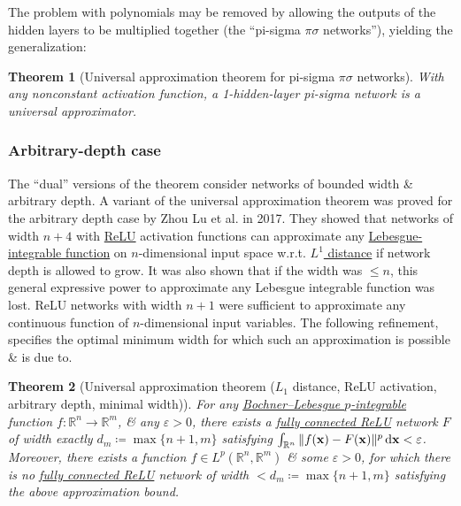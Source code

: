 \documentclass{article}
\newtheorem{theorem}{Theorem}
\begin{document}
The problem with polynomials may be removed by allowing the outputs of the hidden layers to be multiplied together (the ``pi-sigma $\pi\sigma$ networks''), yielding the generalization:

\begin{theorem}[Universal approximation theorem for pi-sigma $\pi\sigma$ networks]
	With any nonconstant activation function, a 1-hidden-layer pi-sigma network is a universal approximator.
\end{theorem}

\subsubsection{Arbitrary-depth case}
The ``dual'' versions of the theorem consider networks of bounded width \& arbitrary depth. A variant of the universal approximation theorem was proved for the arbitrary depth case by Zhou Lu et al. in 2017. They showed that networks of width $n + 4$ with \href{https://en.wikipedia.org/wiki/ReLU}{ReLU} activation functions can approximate any \href{https://en.wikipedia.org/wiki/Lebesgue_integration}{Lebesgue-integrable function} on $n$-dimensional input space w.r.t. \href{https://en.wikipedia.org/wiki/L1_distance}{$L^1$ distance} if network depth is allowed to grow. It was also shown that if the width was $\le n$, this general expressive power to approximate any Lebesgue integrable function was lost. ReLU networks with width $n + 1$ were sufficient to approximate any continuous function of $n$-dimensional input variables. The following refinement, specifies the optimal minimum width for which such an approximation is possible \& is due to.

\begin{theorem}[Universal approximation theorem ($L_1$ distance, ReLU activation, arbitrary depth, minimal width)]
	For any \href{https://en.wikipedia.org/wiki/Bochner_integral}{Bochner--Lebesgue $p$-integrable} function $f:\mathbb{R}^n\to\mathbb{R}^m$, \& any $\varepsilon > 0$, there exists a \href{https://en.wikipedia.org/wiki/Fully_connected_network}{fully connected ReLU} network $F$ of width exactly $d_m\coloneqq\max\{n + 1,m\}$ satisfying $\int_{\mathbb{R}^n} \|f({\bf x}) - F({\bf x})\|^p\,{\rm d}{\bf x} < \varepsilon$. Moreover, there exists a function $f\in L^p(\mathbb{R}^n,\mathbb{R}^m)$ \& some $\varepsilon > 0$, for which there is no \href{https://en.wikipedia.org/wiki/Fully_connected_network}{fully connected ReLU} network of width $< d_m\coloneqq\max\{n + 1,m\}$ satisfying the above approximation bound.
\end{theorem}
\end{document}
